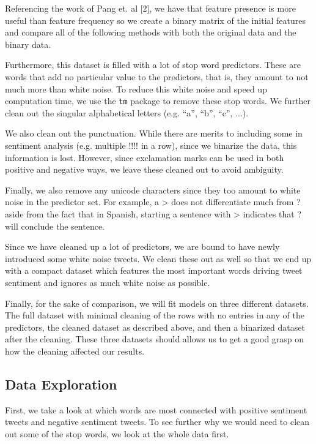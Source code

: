 \documentclass{article}
\begin{document}
Referencing the work of Pang et. al [2], we have that feature presence is more useful than feature frequency so we create a binary matrix of the initial features and compare all of the following methods with both the original data and the binary data.

Furthermore, this dataset is filled with a lot of stop word predictors. These are words that add no particular value to the predictors, that is, they amount to not much more than white noise. To reduce this white noise and speed up computation time, we use the \texttt{tm} package to remove these stop words. We further clean out the singular alphabetical letters (e.g. ``a'', ``b'', ``c'', ...). 

We also clean out the punctuation. While there are merits to including some in sentiment analysis (e.g. multiple !!!! in a row), since we binarize the data, this information is lost. However, since exclamation marks can be used in both positive and negative ways, we leave these cleaned out to avoid ambiguity. %

Finally, we also remove any unicode characters since they too amount to white noise in the predictor set. For example, a > does not differentiate much from ? aside from the fact that in Spanish, starting a sentence with > indicates that ? will conclude the sentence. 

Since we have cleaned up a lot of predictors, we are bound to have newly introduced some white noise tweets. We clean these out as well so that we end up with a compact dataset which features the most important words driving tweet sentiment and ignores as much white noise as possible.

Finally, for the sake of comparison, we will fit models on three different datasets. The full dataset with minimal cleaning of the rows with no entries in any of the predictors, the cleaned dataset as described above, and then a binarized dataset after the cleaning. These three datasets should allows us to get a good grasp on how the cleaning affected our results.

\subsection{Data Exploration}
First, we take a look at which words are most connected with positive sentiment tweets and negative sentiment tweets. To see further why we would need to clean out some of the stop words, we look at the whole data first. 
\end{document}
